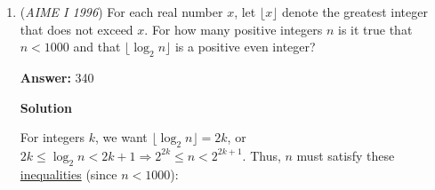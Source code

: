 \begin{enumerate}
 \[3x-285=x+115\Rightarrow 2x=400\Rightarrow x=\boxed{200}\]




\textbf{Solution 2}

Use the table from above. Obviously $c = 114$. Hence $a+e = 115$. Similarly, $1+a = 96 + e \Rightarrow a = 95+e$.

 Substitute that into the first to get $2e = 20 \Rightarrow e=10$, so $a=105$, and so the value of $x$ is just $115+x = 210 + 105 \Rightarrow x = \boxed{200}$




\textbf{Solution 3}


 \[\begin{array}{|c|c|c|} \multicolumn{3}{c}{\text{Table}}\\\hline x&19&96\\\hline 1&a&b\\\hline c&d&e\\\hline \end{array}\]The formula 
 \[e=\frac{1+19}{2}\] can be used. Therefore, $e=10$. Similarly, 
 \[96=\frac{1+d}{2}\]So $d=191$.

 Now we have this table:
 \[\begin{array}{|c|c|c|} \multicolumn{3}{c}{\text{Table}}\\\hline x&19&96\\\hline 1&a&b\\\hline c&191&10\\\hline \end{array}\]By property of magic squares, observe that
 \[x+a+10=19+a+191\]The $a$'s cancel! We now have 
 \[x+10=19+191\]Thus $x=\boxed{200}.$



	\item (\textit{AIME I 1996}) For each real number $x$, let $\lfloor x \rfloor$ denote the greatest integer that does not exceed $x$. For how many positive integers $n$ is it true that $n<1000$ and that $\lfloor \log_{2} n \rfloor$ is a positive even integer?


 
 \textbf{Answer: }340



\textbf{Solution}

For integers $k$, we want $\lfloor \log_2 n\rfloor = 2k$, or $2k \le \log_2 n < 2k+1 \Longrightarrow 2^{2k} \le n < 2^{2k+1}$. Thus, $n$ must satisfy these \href{https://artofproblemsolving.com/wiki/index.php?title=Inequality}{inequalities} (since $n < 1000$):


\end{enumerate}
